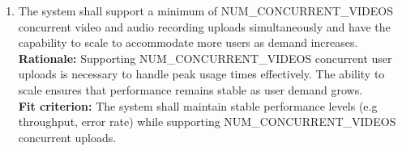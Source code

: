 \documentclass[12pt]{article}
\begin{document}
\begin{enumerate}[label={PR-CR}4. ]
  \item The system shall support a minimum of NUM\_CONCURRENT\_VIDEOS concurrent video and audio recording uploads simultaneously and have the capability to scale to accommodate more users as demand increases.\\
  \textbf{Rationale: }Supporting NUM\_CONCURRENT\_VIDEOS concurrent user uploads is necessary to handle peak usage times effectively. The ability to scale ensures that performance remains stable as user demand grows.\\
  \textbf{Fit criterion: }The system shall maintain stable performance levels (e.g throughput, error rate) while supporting NUM\_CONCURRENT\_VIDEOS concurrent uploads.  
\end{enumerate}

\newpage
\end{document}
